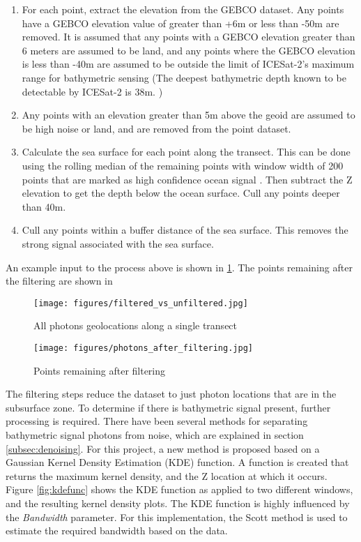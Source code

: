 \begin{enumerate}
    \item For each point, extract the elevation from the GEBCO dataset. Any points have a GEBCO elevation value of greater than +6m or less than -50m are removed. It is assumed that any points with a GEBCO elevation greater than 6 meters are assumed to be land, and any points where the GEBCO elevation is less than -40m are assumed to be outside the limit of ICESat-2's maximum range for bathymetric sensing (The deepest bathymetric depth known to be detectable by ICESat-2 is 38m. \parencite{Parrish2019})
    
    \item Any points with an elevation greater than 5m above the geoid are assumed to be high noise or land, and are removed from the point dataset.

    \item Calculate the sea surface for each point along the transect. This can be done using the rolling median of the remaining points with window width of 200 points that are marked as high confidence ocean signal \parencite{Ranndal2021}. Then subtract the Z elevation to get the depth below the ocean surface.  Cull any points deeper than 40m. 
    \item Cull any points within a buffer distance of the sea surface. This removes the strong signal associated with the sea surface.
\end{enumerate}

An example input to the process above is shown in \ref{fig:filtering_results}. The points remaining after the filtering are shown in 

\begin{figure}[h!]
    \centering
    \texttt{[image: figures/filtered\_vs\_unfiltered.jpg]}
    \caption{All photons geolocations along a single transect}
    \label{fig:filtering_results}
\end{figure}

\begin{figure}[h!]
    \centering
    \texttt{[image: figures/photons\_after\_filtering.jpg]}
    \caption{Points remaining after filtering}
    \label{fig:filtered_pts_only}
\end{figure}

The filtering steps reduce the dataset to just photon locations that are in the subsurface zone. To determine if there is bathymetric signal present, further processing is required. There have been several methods for separating bathymetric signal photons from noise, which are explained in section \ref{subsec:denoising}. For this project, a new method is proposed based on a Gaussian Kernel Density Estimation (KDE) function. A function is created that returns the maximum kernel density, and the Z location at which it occurs. Figure \ref{fig:kdefunc} shows the KDE function as applied to two different windows, and the resulting kernel density plots. The KDE function is highly influenced by the \emph{Bandwidth} parameter. For this implementation, the Scott method \parencite{Scott2015} is used to estimate the required bandwidth based on the data. 

